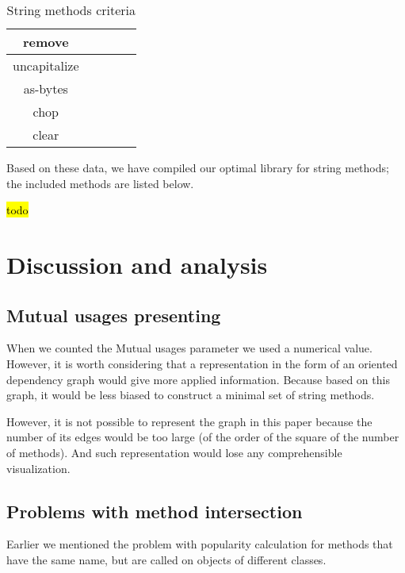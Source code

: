\documentclass[anonymous,sigplan,review,11pt,nonacm,natbib=false]{acmart}
\begin{document}
\begin{table*}[]
\begin{tabular}{|c||c|c|c|c|}
            remove &  &  &  & \\ \hline

            uncapitalize &  &  &  & \\ \hline

            as-bytes &  &  &  & \\ \hline

            chop &  &  &  & \\ \hline

            clear &  &  &  & \\ \hline

        \end{tabular}
        \caption{String methods criteria}
        \label{tab:my_label}
    \end{table*}

    Based on these data, we have compiled our optimal library for string methods; the included methods are listed below.

    \hl{todo}

    \section{Discussion and analysis}

    \subsection{Mutual usages presenting}

    When we counted the Mutual usages parameter we used a numerical value. However, it is worth considering that a representation in the form of an oriented dependency graph would give more applied information. Because based on this graph, it would be less biased to construct a minimal set of string methods.

    However, it is not possible to represent the graph in this paper because the number of its edges would be too large (of the order of the square of the number of methods). And such representation would lose any comprehensible visualization.

    \subsection{Problems with method intersection}

    Earlier we mentioned the problem with popularity calculation for methods that have the same name, but are called on objects of different classes.
\end{document}
